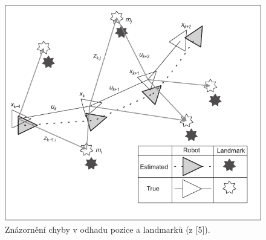 \documentclass[12pt]{report}
\begin{document}
\begin{figure}[!ht]
	\begin{center}
		\includegraphics[width=0.6\columnwidth]{imgs/SLAM_estimate_vs_reality.pdf}
	\end{center}
	\caption{Znázornění chyby v odhadu pozice a landmarků (z [5]).}
	\label{fig:SLAM_estimate_vs_reality}
\end{figure}
\end{document}
